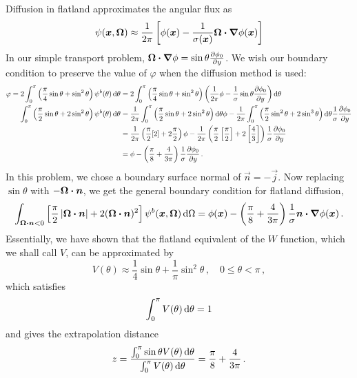 Diffusion in flatland approximates the angular flux as 
\begin{equation*}
  \psi(\bm{x}, \bm{\Omega}) \approx \frac{1}{2\pi} \left[ \phi(\bm{x}) -
  \frac{1}{\sigma(\bm{x})} \bm{\Omega}
\bm{\cdot} \bm{\nabla} \phi(\bm{x}) \right]
\end{equation*}
In our simple transport problem, $\bm{\Omega} \bm{\cdot} \bm{\nabla} \phi=\sin\theta
\frac{\partial \phi_0}{\partial y}$. We wish our boundary condition to preserve the value of
$\varphi$ when the diffusion method is used:
\begin{align*}
 \varphi = 2\int_{0}^{\pi} \left( \frac{\pi}{4} \sin\theta + \sin^2\theta \right)
 \psi^b(\theta) \mathop{}\!\mathrm{d}\theta
 &= 
  2\int_{0}^{\pi} \left( \frac{\pi}{4} \sin\theta + \sin^2\theta \right)
 \left( \frac{1}{2\pi} \phi -
  \frac{1}{\sigma} \sin\theta \frac{\partial \phi_0}{\partial y}\right)\mathop{}\!\mathrm{d}\theta
\\
\int_{0}^{\pi} \left( \frac{\pi}{2} \sin\theta + 2 \sin^2\theta \right)
 \psi^b(\theta) \mathop{}\!\mathrm{d}\theta
 &= 
\frac{1}{2\pi} \int_{0}^{\pi} \left( \frac{\pi}{2} \sin\theta + 2 \sin^2\theta
\right)\mathop{}\!\mathrm{d}\theta
 \phi -
 \frac{1}{2\pi} \int_{0}^{\pi} \left( \frac{\pi}{2} \sin^2\theta + 2 \sin^3\theta \right)\mathop{}\!\mathrm{d}\theta \frac{1}{\sigma} \frac{\partial \phi_0}{\partial y}
  \\
 &= 
 \frac{1}{2\pi} \left( \frac{\pi}{2} [2] + 2 \frac{\pi}{2}
\right) \phi
-
\frac{1}{2\pi} \left( \frac{\pi}{2} \left[ \frac{\pi}{2} \right] + 2 \left[
\frac{4}{3} \right] \right) \frac{1}{\sigma} \frac{\partial \phi_0}{\partial y}
\\
 &= 
  \phi
- \left( \frac{\pi}{8} + \frac{4}{3\pi} \right) \frac{1}{\sigma} \frac{\partial \phi_0}{\partial y}
\,.
\end{align*}
In this problem, we chose a boundary surface normal of $\vec{n}=-\vec{j}$. Now
replacing $\sin \theta$ with $-\bm{\Omega}\bm{\cdot}\bm{n}$, we get the general
boundary condition for flatland diffusion,
\begin{equation} \label{eq:flatlandDiffusionVarBc}
\int_{\bm{\Omega}\bm{\cdot}\bm{n} < 0} \left[ \frac{\pi}{2}
\left| \bm{\Omega}\bm{\cdot}\bm{n} \right| + 2 (\bm{\Omega}\bm{\cdot}\bm{n})^2 \right]
\psi^b(\bm{x}, \bm{\Omega}) \mathop{}\!\mathrm{d}\Omega
= 
  \phi(\bm{x})
  - \left( \frac{\pi}{8} + \frac{4}{3\pi} \right) \frac{1}{\sigma}
  \bm{n}\bm{\cdot}\bm{\nabla} \phi(\bm{x})\,.
\end{equation}
Essentially, we have shown that the flatland equivalent of the $W$ function,
which we shall call $V$, can be approximated by
\begin{equation}\label{eq:flatlandVariational}
  V(\theta)
  \approx \frac{1}{4}\sin\theta + \frac{1}{\pi} \sin^2\theta \,,\quad
  0 \le \theta < \pi \,,
\end{equation}
which satisfies
\begin{equation*}
  \int_{0}^{\pi} V(\theta) \mathop{}\!\mathrm{d}\theta= 1
\end{equation*}
and gives the extrapolation distance
\begin{equation*}
  z = \frac{\int_{0}^{\pi} \sin \theta V(\theta) \mathop{}\!\mathrm{d}\theta}{\int_{0}^{\pi}
  V(\theta) \mathop{}\!\mathrm{d}\theta} =  \frac{\pi}{8} + \frac{4}{3\pi} \,.
\end{equation*}

